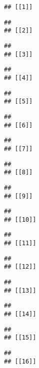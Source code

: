 \documentclass[]{article}
\begin{document}
\begin{verbatim}
## [[1]]
\end{verbatim}

\begin{verbatim}
## 
## [[2]]
\end{verbatim}

\begin{verbatim}
## 
## [[3]]
\end{verbatim}

\begin{verbatim}
## 
## [[4]]
\end{verbatim}

\begin{verbatim}
## 
## [[5]]
\end{verbatim}

\begin{verbatim}
## 
## [[6]]
\end{verbatim}

\begin{verbatim}
## 
## [[7]]
\end{verbatim}

\begin{verbatim}
## 
## [[8]]
\end{verbatim}

\begin{verbatim}
## 
## [[9]]
\end{verbatim}

\begin{verbatim}
## 
## [[10]]
\end{verbatim}

\begin{verbatim}
## 
## [[11]]
\end{verbatim}

\begin{verbatim}
## 
## [[12]]
\end{verbatim}

\begin{verbatim}
## 
## [[13]]
\end{verbatim}

\begin{verbatim}
## 
## [[14]]
\end{verbatim}

\begin{verbatim}
## 
## [[15]]
\end{verbatim}

\begin{verbatim}
## 
## [[16]]
\end{verbatim}
\end{document}
